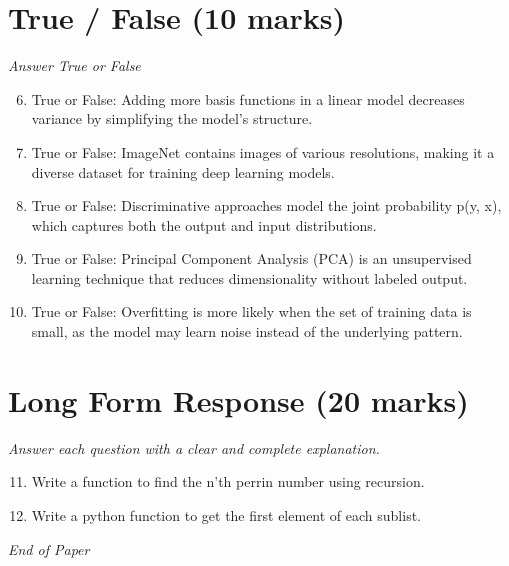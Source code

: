 \documentclass[12pt]{article}
\begin{document}
\section*{True / False (10 marks)}
\textit{Answer True or False}
\begin{enumerate}[label=\arabic*.]
\setcounter{enumi}{5}
\item True or False: Adding more basis functions in a linear model decreases variance by simplifying the model's structure.
\item True or False: ImageNet contains images of various resolutions, making it a diverse dataset for training deep learning models.
\item True or False: Discriminative approaches model the joint probability p(y, x), which captures both the output and input distributions.
\item True or False: Principal Component Analysis (PCA) is an unsupervised learning technique that reduces dimensionality without labeled output.
\item True or False: Overfitting is more likely when the set of training data is small, as the model may learn noise instead of the underlying pattern.
\end{enumerate}

\section*{Long Form Response (20 marks)}
\textit{Answer each question with a clear and complete explanation.}
\begin{enumerate}[label=\arabic*.]
\setcounter{enumi}{10}
\item Write a function to find the n'th perrin number using recursion.
\item Write a python function to get the first element of each sublist.
\end{enumerate}

\vfill
\noindent\textit{End of Paper}
\end{document}
